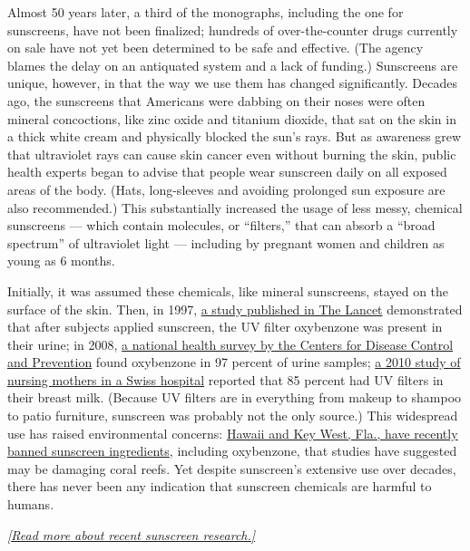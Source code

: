 Almost 50 years later, a third of the monographs, including the one for
sunscreens, have not been finalized; hundreds of over-the-counter drugs
currently on sale have not yet been determined to be safe and effective.
(The agency blames the delay on an antiquated system and a lack of
funding.) Sunscreens are unique, however, in that the way we use them
has changed significantly. Decades ago, the sunscreens that Americans
were dabbing on their noses were often mineral concoctions, like zinc
oxide and titanium dioxide, that sat on the skin in a thick white cream
and physically blocked the sun's rays. But as awareness grew that
ultraviolet rays can cause skin cancer even without burning the skin,
public health experts began to advise that people wear sunscreen daily
on all exposed areas of the body. (Hats, long-sleeves and avoiding
prolonged sun exposure are also recommended.) This substantially
increased the usage of less messy, chemical sunscreens --- which contain
molecules, or ``filters,'' that can absorb a ``broad spectrum'' of
ultraviolet light --- including by pregnant women and children as young
as 6 months.

Initially, it was assumed these chemicals, like mineral sunscreens,
stayed on the surface of the skin. Then, in 1997,
\href{https://www.thelancet.com/journals/lancet/article/PIIS0140-6736(05)62032-6/fulltext}{a
study published in The Lancet} demonstrated that after subjects applied
sunscreen, the UV filter oxybenzone was present in their urine; in 2008,
\href{https://www.ncbi.nlm.nih.gov/pmc/articles/PMC2453157/}{a national
health survey by the Centers for Disease Control and Prevention} found
oxybenzone in 97 percent of urine samples;
\href{https://www.sciencedirect.com/science/article/pii/S004565351001132X}{a
2010 study of nursing mothers in a Swiss hospital} reported that 85
percent had UV filters in their breast milk. (Because UV filters are in
everything from makeup to shampoo to patio furniture, sunscreen was
probably not the only source.) This widespread use has raised
environmental concerns:
\href{https://www.nytimes3xbfgragh.onion/2019/02/07/us/sunscreen-coral-reef-key-west.html}{Hawaii
and Key West, Fla., have recently banned sunscreen ingredients},
including oxybenzone, that studies have suggested may be damaging coral
reefs. Yet despite sunscreen's extensive use over decades, there has
never been any indication that sunscreen chemicals are harmful to
humans.

\href{https://www.nytimes3xbfgragh.onion/2019/06/10/upshot/how-safe-is-sunscreen.html}{\emph{{[}Read
more about recent sunscreen research.{]}}}

